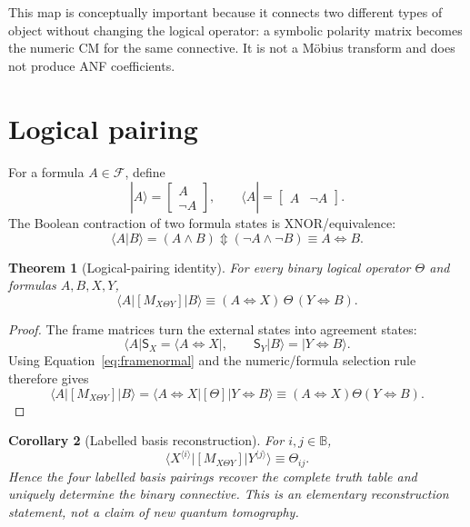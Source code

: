 \documentclass[11pt]{article}
\newtheorem{theorem}{Theorem}[section]
\newtheorem{corollary}[theorem]{Corollary}
\theoremstyle{definition}
\theoremstyle{remark}
\newcommand{\B}{\mathbb B}
\newcommand{\cF}{\mathcal F}
\newcommand{\xor}{\mathbin{\Updownarrow}}
\begin{document}
This map is conceptually important because it connects two different types of object without changing the logical operator: a symbolic polarity matrix becomes the numeric CM for the same connective.  It is not a M\"obius transform and does not produce ANF coefficients.

\section{Logical pairing}
\label{sec:pairing}

For a formula $A\in\cF$, define
\[
 |A\rangle=\begin{bmatrix}A\\\neg A\end{bmatrix},\qquad
 \langle A|=\begin{bmatrix}A&\neg A\end{bmatrix}.
\]
The Boolean contraction of two formula states is XNOR/equivalence:
\begin{equation}
 \langle A|B\rangle=(A\land B)\xor(\neg A\land\neg B)
 \equiv A\Leftrightarrow B.
 \label{eq:equivpair}
\end{equation}

\begin{theorem}[Logical-pairing identity]
For every binary logical operator $\Theta$ and formulas $A,B,X,Y$,
\begin{equation}
 \langle A|[M_{X\Theta Y}]|B\rangle
 \equiv (A\Leftrightarrow X)\,\Theta\,(Y\Leftrightarrow B).
 \label{eq:binarypairing}
\end{equation}
\end{theorem}
\begin{proof}
The frame matrices turn the external states into agreement states:
\[
 \langle A|\mathsf S_X=\langle A\Leftrightarrow X|,
 \qquad
 \mathsf S_Y|B\rangle=|Y\Leftrightarrow B\rangle.
\]
Using Equation~\eqref{eq:framenormal} and the numeric/formula selection rule therefore gives
\[
 \langle A|[M_{X\Theta Y}]|B\rangle
 =\langle A\Leftrightarrow X|[\Theta]|Y\Leftrightarrow B\rangle
 \equiv (A\Leftrightarrow X)\Theta(Y\Leftrightarrow B).
\]
\end{proof}

\begin{corollary}[Labelled basis reconstruction]
\label{cor:basisreconstruction}
For $i,j\in\B$,
\begin{equation}
 \langle X^{\langle i\rangle}|[M_{X\Theta Y}]|Y^{\langle j\rangle}\rangle
 \equiv \Theta_{ij}.
 \label{eq:basisreconstruction}
\end{equation}
Hence the four labelled basis pairings recover the complete truth table and uniquely determine the binary connective.  This is an elementary reconstruction statement, not a claim of new quantum tomography.
\end{corollary}
\end{document}
